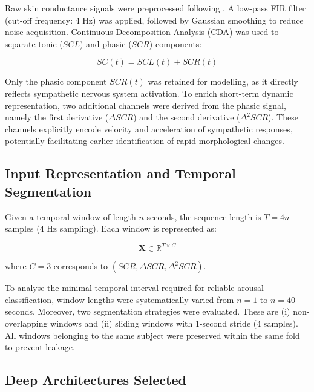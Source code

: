 \documentclass[runningheads]{llncs}
\begin{document}
Raw skin conductance signals were preprocessed following \cite{SanchezReolid2022}. A low-pass FIR filter (cut-off frequency: 4 Hz) was applied, followed by Gaussian smoothing to reduce noise acquisition. Continuous Decomposition Analysis (CDA) was used to separate tonic ($SCL$) and phasic ($SCR$) components:

\begin{equation}
SC(t) = SCL(t) + SCR(t)
\end{equation}

Only the phasic component $SCR(t)$ was retained for modelling, as it directly reflects sympathetic nervous system activation. To enrich short-term dynamic representation, two additional channels were derived from the phasic signal, namely the first derivative ($\Delta SCR$) and the second derivative ($\Delta^2 SCR$). These channels explicitly encode velocity and acceleration of sympathetic responses, potentially facilitating earlier identification of rapid morphological changes.

\subsection{Input Representation and Temporal Segmentation}

Given a temporal window of length $n$ seconds, the sequence length is $T = 4n$ samples (4 Hz sampling). Each window is represented as:

\begin{equation}
\mathbf{X} \in \mathbb{R}^{T \times C}
\end{equation}

\noindent where $C = 3$ corresponds to $(SCR, \Delta SCR, \Delta^2 SCR)$.

To analyse the minimal temporal interval required for reliable arousal classification, window lengths were systematically varied from $n=1$ to $n=40$ seconds. Moreover, two segmentation strategies were evaluated. These are (i) non-overlapping windows and (ii) sliding windows with 1-second stride (4 samples). All windows belonging to the same subject were preserved within the same fold to prevent leakage.

\subsection{Deep Architectures Selected}
\end{document}
